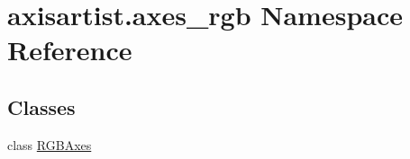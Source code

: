 \hypertarget{namespaceaxisartist_1_1axes__rgb}{}\section{axisartist.\+axes\+\_\+rgb Namespace Reference}
\label{namespaceaxisartist_1_1axes__rgb}
\subsection*{Classes}
\begin{DoxyCompactItemize}
\item 
class \hyperlink{classaxisartist_1_1axes__rgb_1_1RGBAxes}{R\+G\+B\+Axes}
\end{DoxyCompactItemize}
